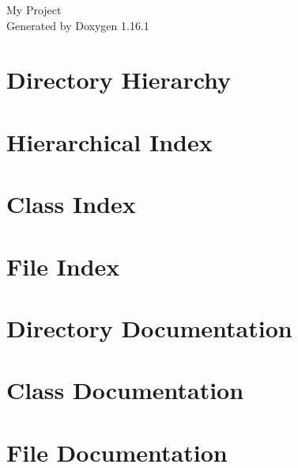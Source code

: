 \documentclass[twoside]{book}
\newcommand{\+}{\discretionary{\mbox{\scriptsize$\hookleftarrow$}}{}{}}
\newcommand{\clearemptydoublepage}{%
    \newpage{\pagestyle{empty}\cleardoublepage}%
  }
\begin{document}
  \raggedbottom
    \hypersetup{pageanchor=false,
                bookmarksnumbered=true,
                pdfencoding=unicode
               }
  \begin{titlepage}
  \vspace*{7cm}
  \begin{center}%
  {\Large My Project}\\
  \vspace*{1cm}
  {\large Generated by Doxygen 1.16.1}\\
  \end{center}
  \end{titlepage}
  \clearemptydoublepage
  \tableofcontents
  \clearemptydoublepage
  \hypersetup{pageanchor=true}

\chapter{Directory Hierarchy}

\chapter{Hierarchical Index}

\chapter{Class Index}

\chapter{File Index}

\chapter{Directory Documentation}


\chapter{Class Documentation}



\chapter{File Documentation}

























  \backmatter
  \newpage
  \clearemptydoublepage
  \printindex
\end{document}

